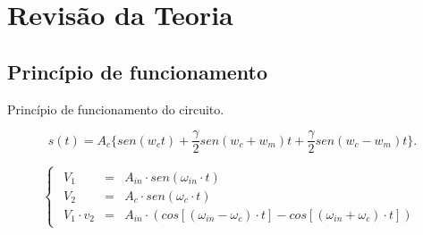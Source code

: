 \newpage
\section{Revisão da Teoria}
\subsection{Princípio de funcionamento}
Princípio de funcionamento do circuito.

\begin{equation}
    s(t) = A_c  \bigg \{ sen(w_c t) + \frac{\gamma}{2}sen(w_c + w_m)t + \frac{\gamma}{2}sen(w_c - w_m)t \bigg  \} .
    \label{e_amdsb}
\end{equation}


\begin{equation}
    \begin{cases}
        \begin{array}{rcl}
            V_1          & = & A_{in} \cdot sen(\omega_{in}\cdot t) \\
            V_2          & = & A_{c} \cdot sen(\omega_{c}\cdot t) \\
            V_1\cdot v_2 & = & A_{in} \cdot( cos[(\omega_{in} - \omega_{c})\cdot t] - cos[(\omega_{in} + \omega_{c})\cdot t])
        \end{array}
    \end{cases}
\end{equation}